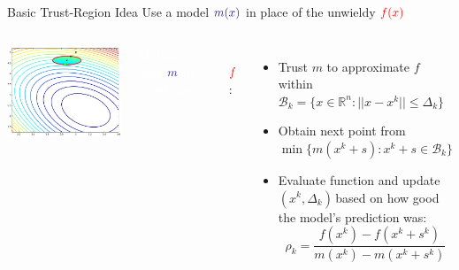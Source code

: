 \documentclass[handout,aspectratio=54]{beamer}
\numberwithin{theorem}{section}
\begin{document}
\begin{frame}{Basic Trust-Region Idea}
Use a model $\textcolor{blue}{m(x)}$ in place of the unwieldy $\textcolor{red}{f(x)}$

\begin{columns}
\includegraphics[width=\textwidth]{fig/22-3.jpg}

\colorbox[rgb]{0.5,0.6,0.7}{\textcolor{white}{Optimize over }$\textcolor{blue}{m}$ \textcolor{white}{to avoidexpense }}

\colorbox[rgb]{0.5,0.6,0.7}{\textcolor{white}{of} $\textcolor{red}{f}$:}

\begin{itemize}
\item Trust $m$ to approximate $f$ within $ \mathcal{B}_k=\{x\in\mathbb{R}^n:||x-x^k||\le \Delta_k\}$
\item Obtain next point from $\min\{m(x^k+s):x^k+s\in  \mathcal{B}_k\}$
\item Evaluate function and update $(x^k, \Delta_k)$\,based on how good the model's prediction was:
\begin{equation*}
\rho_k=\frac{f(x^k)-f(x^k+s^k)}{m(x^k)-m(x^k+s^k)}
\end{equation*}
\end{itemize}

\footnotesize{}
\end{columns}
\end{frame}
\end{document}
